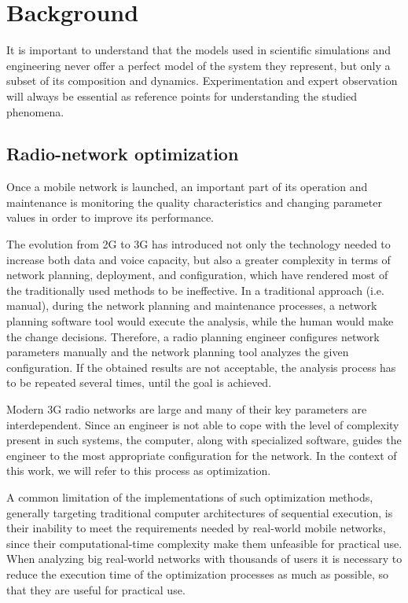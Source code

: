 
\chapter{Background \label{chap:Background-and-motivation}}


It is important to understand that the models used in scientific simulations
and engineering never offer a perfect model of the system they represent,
but only a subset of its composition and dynamics. Experimentation
and expert observation will always be essential as reference points
for understanding the studied phenomena.


\section{Radio-network optimization}

Once a mobile network is launched, an important part of its operation
and maintenance is monitoring the quality characteristics and changing
parameter values in order to improve its performance.

The evolution from 2G to 3G has introduced not only the technology
needed to increase both data and voice capacity, but also a greater
complexity in terms of network planning, deployment, and configuration,
which have rendered most of the traditionally used methods to be ineffective.
In a traditional approach (i.e. manual), during the network planning
and maintenance processes, a network planning software tool would
execute the analysis, while the human would make the change decisions.
Therefore, a radio planning engineer configures network parameters
manually and the network planning tool analyzes the given configuration.
If the obtained results are not acceptable, the analysis process has
to be repeated several times, until the goal is achieved.

Modern 3G radio networks are large and many of their key parameters
are interdependent. Since an engineer is not able to cope with the
level of complexity present in such systems, the computer, along with
specialized software, guides the engineer to the most appropriate
configuration for the network. In the context of this work, we will
refer to this process as optimization.

A common limitation of the implementations of such optimization methods,
generally targeting traditional computer architectures of sequential
execution, is their inability to meet the requirements needed by real-world
mobile networks, since their computational-time complexity make them
unfeasible for practical use. When analyzing big real-world networks
with thousands of users it is necessary to reduce the execution time
of the optimization processes as much as possible, so that they are
useful for practical use.

